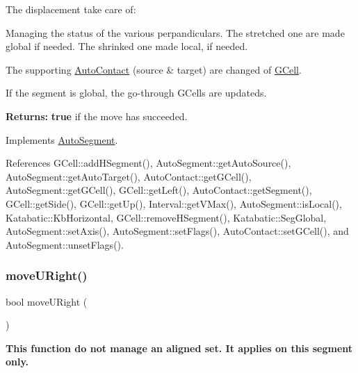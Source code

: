 The displacement take care of\+:
\begin{DoxyItemize}
\item Managing the status of the various perpandiculars. The stretched one are made global if needed. The shrinked one made local, if needed.
\item The supporting \mbox{\hyperlink{classKatabatic_1_1AutoContact}{Auto\+Contact}} (source \& target) are changed of \mbox{\hyperlink{classKatabatic_1_1GCell}{G\+Cell}}.
\item If the segment is global, the go-\/through G\+Cells are updateds.
\end{DoxyItemize}

{\bfseries Returns\+:} {\bfseries true} if the move has succeeded.

 

Implements \mbox{\hyperlink{classKatabatic_1_1AutoSegment_af8ca7b17e952f4b599aeeb2f4e5be395}{Auto\+Segment}}.



References G\+Cell\+::add\+H\+Segment(), Auto\+Segment\+::get\+Auto\+Source(), Auto\+Segment\+::get\+Auto\+Target(), Auto\+Contact\+::get\+G\+Cell(), Auto\+Segment\+::get\+G\+Cell(), G\+Cell\+::get\+Left(), Auto\+Contact\+::get\+Segment(), G\+Cell\+::get\+Side(), G\+Cell\+::get\+Up(), Interval\+::get\+V\+Max(), Auto\+Segment\+::is\+Local(), Katabatic\+::\+Kb\+Horizontal, G\+Cell\+::remove\+H\+Segment(), Katabatic\+::\+Seg\+Global, Auto\+Segment\+::set\+Axis(), Auto\+Segment\+::set\+Flags(), Auto\+Contact\+::set\+G\+Cell(), and Auto\+Segment\+::unset\+Flags().

\mbox{\label{classKatabatic_1_1AutoVertical_aa469e37853e31f8b1bc817518c896d62}} 
\subsubsection{\texorpdfstring{move\+U\+Right()}{moveURight()}}
{\footnotesize\ttfamily bool move\+U\+Right (\begin{DoxyParamCaption}{ }\end{DoxyParamCaption})\hspace{0.3cm}{\ttfamily [virtual]}}

{\bfseries This function do not manage an aligned set. It applies on {\ttfamily this} segment only.}

